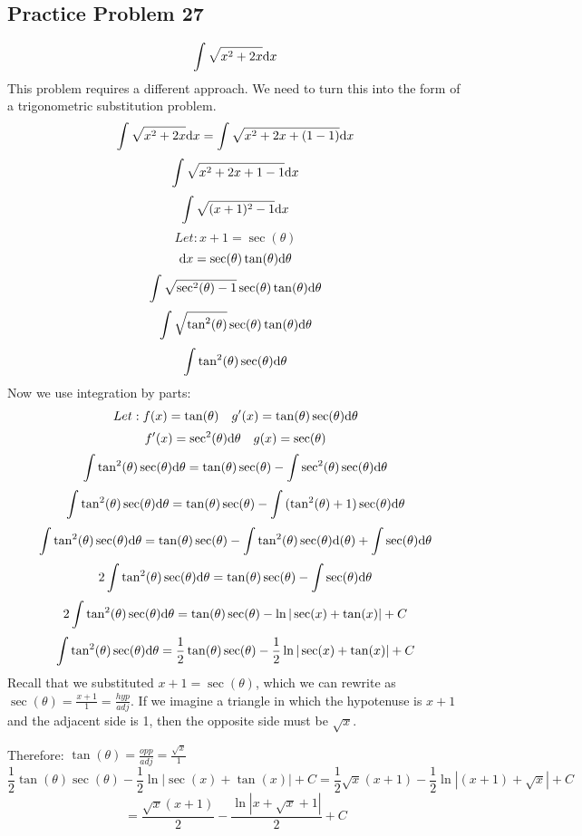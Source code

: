 \documentclass{math}
\begin{document}
\subsection*{Practice Problem 27}
\[ \int{\sqrt{x^{2}+2x}\mathrm{d}{x}} \]
This problem requires a different approach. We need to turn this into the form
of a trigonometric substitution problem.
\[ \int{\sqrt{x^{2}+2x}\mathrm{d}{x}} = \int{\sqrt{x^{2}+2x+(1-1)}\mathrm{d}{x}} \]
\[ \int{\sqrt{x^{2}+2x+1-1}\mathrm{d}{x}} \]
\[ \int{\sqrt{(x+1)^{2}-1}\mathrm{d}{x}} \]
\[ Let: x+1 = \sec(\theta) \]
\[ \mathrm{d}{x} = \sec(\theta)\tan(\theta)\mathrm{d}{\theta} \]
\[ \int{\sqrt{\sec^{2}(\theta)-1}\sec(\theta)\tan(\theta)\mathrm{d}{\theta}} \]
\[ \int{\sqrt{\tan^{2}(\theta)}\sec(\theta)\tan(\theta)\mathrm{d}{\theta}} \]
\[ \int{\tan^{2}(\theta)\sec(\theta)\mathrm{d}{\theta}} \]
Now we use integration by parts:
\[ Let: f(x) = \tan(\theta) \quad
   g'(x) = \tan(\theta)\sec(\theta)\mathrm{d}{\theta} \]
\[ f'(x) = \sec^{2}(\theta)\mathrm{d}{\theta} \quad g(x) = \sec(\theta) \]
\[ \int{\tan^{2}(\theta)\sec(\theta)\mathrm{d}{\theta}} =
   \tan(\theta)\sec(\theta)-\int{\sec^{2}(\theta)\sec(\theta)\mathrm{d}{\theta}} \]
\[ \int{\tan^{2}(\theta)\sec(\theta)\mathrm{d}{\theta}} =
   \tan(\theta)\sec(\theta)-
   \int{(\tan^{2}(\theta)+1)\sec(\theta)\mathrm{d}{\theta}} \]
\[ \int{\tan^{2}(\theta)\sec(\theta)\mathrm{d}{\theta}} =
   \tan(\theta)\sec(\theta)-\int{\tan^{2}(\theta)\sec(\theta)\mathrm{d}(\theta)}+
   \int{\sec(\theta)\mathrm{d}{\theta}} \]
\[ 2\int{\tan^{2}(\theta)\sec(\theta)\mathrm{d}{\theta}} =
   \tan(\theta)\sec(\theta)-\int{\sec(\theta)\mathrm{d}{\theta}} \]
\[ 2\int{\tan^{2}(\theta)\sec(\theta)\mathrm{d}{\theta}} =
   \tan(\theta)\sec(\theta)-\ln|\sec(x)+\tan(x)|+C \]
\[ \int{\tan^{2}(\theta)\sec(\theta)\mathrm{d}{\theta}} =
   \frac{1}{2}\tan(\theta)\sec(\theta)-\frac{1}{2}\ln|\sec(x)+\tan(x)|+C \]
Recall that we substituted \( x+1 = \sec(\theta) \), which we can rewrite as
\( \sec(\theta) = \frac{x+1}{1} = \frac{hyp}{adj} \). If we imagine a triangle
in which the hypotenuse is \( x+1 \) and the adjacent side is 1, then the
opposite side must be \( \sqrt{x} \).
\begin{center}
\end{center}
Therefore: \( \tan(\theta) = \frac{opp}{adj} = \frac{\sqrt{x}}{1} \)
\[ \frac{1}{2}\tan(\theta)\sec(\theta)-\frac{1}{2}\ln|\sec(x)+\tan(x)|+C =
   \frac{1}{2}\sqrt{x}(x+1)-\frac{1}{2}\ln|(x+1)+\sqrt{x}|+C \]
\[ = \frac{\sqrt{x}(x+1)}{2}-\frac{\ln|x+\sqrt{x}+1|}{2}+C \]
\end{document}
